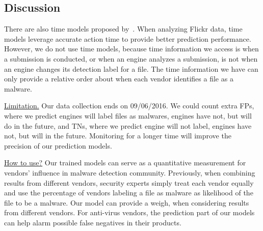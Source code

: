 \subsection{Discussion}

There are also time models proposed by~\citet{Influence}.
When analyzing Flickr data, time models leverage accurate action time to provide better prediction performance. 
However, we do not use time models, 
because time information we access is when a submission is conducted, 
or when an engine analyzes a submission, 
is not when an engine changes its detection label for a file.
The time information we have can only provide a relative order about when each vendor identifies a file as a malware.  

\underline{Limitation.}
Our data collection ends on 09/06/2016. 
We could count extra FPs, where we predict engines will label files as malwares, engines have not, but will do in the future, 
and TNs, where we predict engine will not label, engines have not, but will in the future. 
Monitoring \vt for a longer time will improve the precision of our prediction models. 

\underline{How to use?}
Our trained models can serve as 
a quantitative measurement for vendors’ influence in malware detection community. 
Previously, when combining results from different vendors, 
security experts simply treat each vendor equally and use the percentage of 
vendors labeling a file as malware as likelihood of the file to be a malware. 
Our model can provide a weigh, when considering results from different vendors.  
For anti-virus vendors, the prediction part of our models can help alarm possible false negatives in their products.
